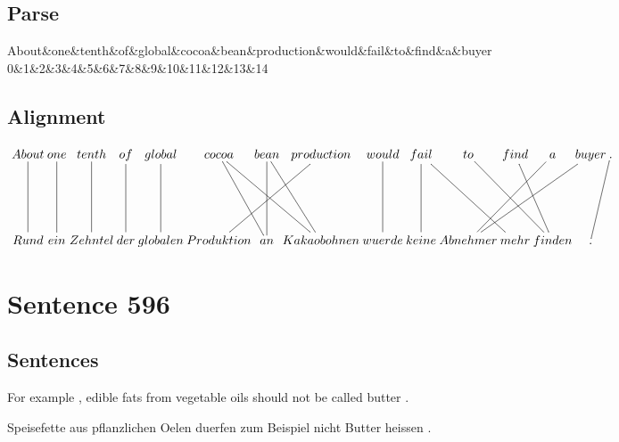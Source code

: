\documentclass{report}
\begin{document}
\subsection*{Parse}
\begin{dependency}[theme=simple]
\begin{deptext}[column sep=.5cm, row sep=.1ex]
About\&one\&tenth\&of\&global\&cocoa\&bean\&production\&would\&fail\&to\&find\&a\&buyer\\
0\&1\&2\&3\&4\&5\&6\&7\&8\&9\&10\&11\&12\&13\&14\\
\end{deptext}
\end{dependency}


\subsection*{Alignment}
\scriptsize{
$
\xymatrix@C-2.3pc{
About \ar @{-} [dd] & one \ar @{-} [dd] & tenth \ar @{-} [dd] & of \ar @{-} [dd] & global \ar @{-} [dd] & cocoa \ar @{-} [ddr] \ar @{-} [ddrr] & bean \ar @{-} [ddr] \ar @{-} [dd] & production \ar @{-} [ddll] & would \ar @{-} [dd] & fail \ar @{-} [ddrr] \ar @{-} [dd] & to \ar @{-} [ddrr] & find \ar @{-} [ddr] & a \ar @{-} [ddll] & buyer \ar @{-} [ddlll] & . \ar @{-} [ddl]\\\\
Rund & ein & Zehntel & der & globalen & Produktion & an & Kakaobohnen & wuerde & keine & Abnehmer & mehr & finden & .
}$}
\newpage\section*{Sentence 596}

\subsection*{Sentences}
For example , edible fats from vegetable oils should not be called butter .

\noindent Speisefette aus pflanzlichen Oelen duerfen zum Beispiel nicht Butter heissen .
\end{document}

